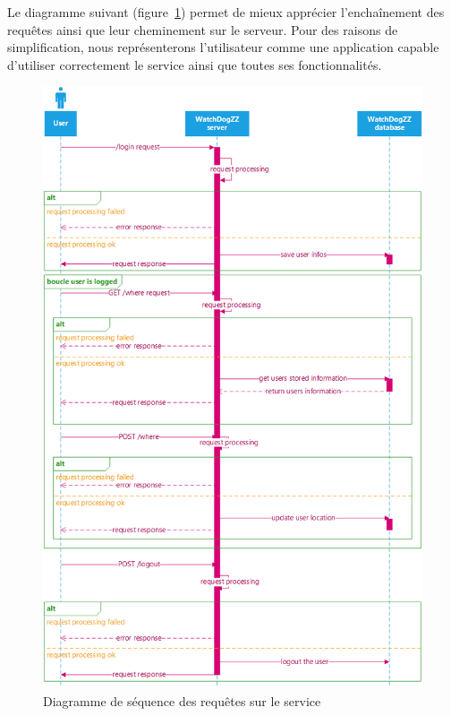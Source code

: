 Le diagramme suivant (figure~\ref{servicereq}) permet de mieux apprécier l'enchaînement des requêtes ainsi que leur cheminement sur le serveur. Pour des raisons de simplification, nous représenterons l'utilisateur comme une application capable d'utiliser correctement le service ainsi que toutes ses fonctionnalités.

\begin{figure}[H]
    \centering
    \includegraphics[height=0.99\textheight]{./img/server-requests.png}
    \caption{Diagramme de séquence des requêtes sur le service}
    \label{servicereq}
\end{figure}

